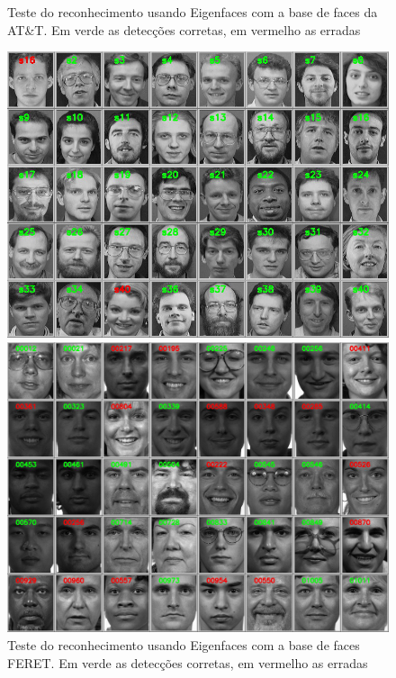 \begin{figure}[htbp]
    \centering
    \caption[Teste do algoritmo Eigenfaces - AT\&T]{Teste do reconhecimento usando Eigenfaces com a base de faces da AT\&T. Em verde as detecções corretas, em vermelho as erradas}
    \label{fig:eigenfaces_resultado_att}
    \includegraphics[width=0.8\linewidth]{imagens/eigenfaces_resultado_att.jpg}
    \vspace{\floatsep}
    \caption[Teste do algoritmo Eigenfaces - FERET]{Teste do reconhecimento usando Eigenfaces com a base de faces FERET. Em verde as detecções corretas, em vermelho as erradas}
    \label{fig:eigenfaces_resultado_feret}
    \includegraphics[width=0.8\linewidth]{imagens/eigenfaces_resultado_feret.jpg}
\end{figure}

